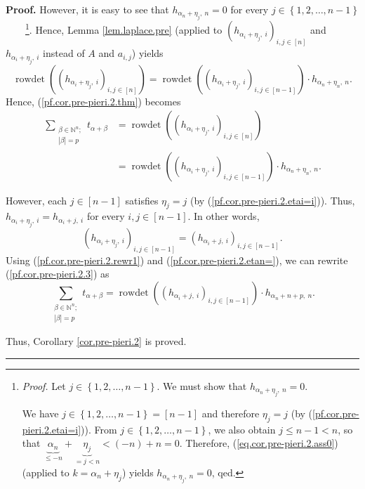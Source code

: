 \documentclass
[numbers=enddot,12pt,final,onecolumn,notitlepage,english]{scrartcl}%
\theoremstyle{definition}
\newenvironment{proof}[1][Proof]{\noindent\textbf{#1.} }{\ \rule{0.5em}{0.5em}}
\let\sumnonlimits\sum
\renewcommand{\sum}{\sumnonlimits\limits}
\newenvironment{verlong}{}{}
\begin{document}
\begin{proof}
\begin{verlong}
However, it is easy to see that $h_{\alpha_{n}+\eta_{j},\ n}=0$ for every
$j\in\left\{  1,2,\ldots,n-1\right\}  $\ \ \ \ \footnote{\textit{Proof.} Let
$j\in\left\{  1,2,\ldots,n-1\right\}  $. We must show that $h_{\alpha_{n}%
+\eta_{j},\ n}=0$.
\par
We have $j\in\left\{  1,2,\ldots,n-1\right\}  =\left[  n-1\right]  $ and
therefore $\eta_{j}=j$ (by (\ref{pf.cor.pre-pieri.2.etai=i})). From
$j\in\left\{  1,2,\ldots,n-1\right\}  $, we also obtain $j\leq n-1<n$, so that
$\underbrace{\alpha_{n}}_{\leq-n}+\underbrace{\eta_{j}}_{=j<n}<\left(
-n\right)  +n=0$. Therefore, (\ref{eq.cor.pre-pieri.2.ass0}) (applied to
$k=\alpha_{n}+\eta_{j}$) yields $h_{\alpha_{n}+\eta_{j},\ n}=0$, qed.}. Hence,
Lemma \ref{lem.laplace.pre} (applied to $\left(  h_{\alpha_{i}+\eta_{j}%
,\ i}\right)  _{i,j\in\left[  n\right]  }$ and $h_{\alpha_{i}+\eta_{j},\ i}$
instead of $A$ and $a_{i,j}$) yields%
\[
\operatorname*{rowdet}\left(  \left(  h_{\alpha_{i}+\eta_{j},\ i}\right)
_{i,j\in\left[  n\right]  }\right)  =\operatorname*{rowdet}\left(  \left(
h_{\alpha_{i}+\eta_{j},\ i}\right)  _{i,j\in\left[  n-1\right]  }\right)
\cdot h_{\alpha_{n}+\eta_{n},\ n}.
\]
Hence, (\ref{pf.cor.pre-pieri.2.thm}) becomes%
\begin{align}
\sum_{\substack{\beta\in\mathbb{N}^{n};\\\left\vert \beta\right\vert
=p}}t_{\alpha+\beta}  &  =\operatorname*{rowdet}\left(  \left(  h_{\alpha
_{i}+\eta_{j},\ i}\right)  _{i,j\in\left[  n\right]  }\right) \nonumber\\
&  =\operatorname*{rowdet}\left(  \left(  h_{\alpha_{i}+\eta_{j},\ i}\right)
_{i,j\in\left[  n-1\right]  }\right)  \cdot h_{\alpha_{n}+\eta_{n},\ n}.
\label{pf.cor.pre-pieri.2.3}%
\end{align}


However, each $j\in\left[  n-1\right]  $ satisfies $\eta_{j}=j$ (by
(\ref{pf.cor.pre-pieri.2.etai=i})). Thus, $h_{\alpha_{i}+\eta_{j}%
,\ i}=h_{\alpha_{i}+j,\ i}$ for every $i,j\in\left[  n-1\right]  $. In other
words,
\begin{equation}
\left(  h_{\alpha_{i}+\eta_{j},\ i}\right)  _{i,j\in\left[  n-1\right]
}=\left(  h_{\alpha_{i}+j,\ i}\right)  _{i,j\in\left[  n-1\right]  }.
\label{pf.cor.pre-pieri.2.rewr1}%
\end{equation}
Using (\ref{pf.cor.pre-pieri.2.rewr1}) and (\ref{pf.cor.pre-pieri.2.etan=}),
we can rewrite (\ref{pf.cor.pre-pieri.2.3}) as
\[
\sum_{\substack{\beta\in\mathbb{N}^{n};\\\left\vert \beta\right\vert
=p}}t_{\alpha+\beta}=\operatorname*{rowdet}\left(  \left(  h_{\alpha
_{i}+j,\ i}\right)  _{i,j\in\left[  n-1\right]  }\right)  \cdot h_{\alpha
_{n}+n+p,\ n}.
\]

\end{verlong}

\noindent Thus, Corollary \ref{cor.pre-pieri.2} is proved.
\end{proof}
\end{document}
